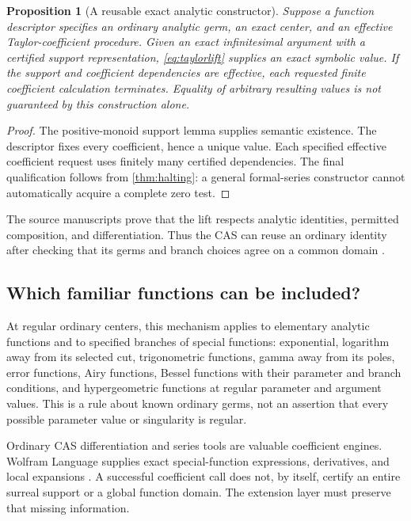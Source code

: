 \documentclass[11pt,letterpaper]{article}
\newtheorem{proposition}[theorem]{Proposition}
\theoremstyle{definition}
\numberwithin{equation}{section}
\begin{document}
\begin{proposition}[A reusable exact analytic constructor]\label{prop:lift}
Suppose a function descriptor specifies an ordinary analytic germ, an exact center, and an effective Taylor-coefficient procedure. Given an exact infinitesimal argument with a certified support representation, \eqref{eq:taylorlift} supplies an exact symbolic value. If the support and coefficient dependencies are effective, each requested finite coefficient calculation terminates. Equality of arbitrary resulting values is not guaranteed by this construction alone.
\end{proposition}
\begin{proof}
The positive-monoid support lemma supplies semantic existence. The descriptor fixes every coefficient, hence a unique value. Each specified effective coefficient request uses finitely many certified dependencies. The final qualification follows from \cref{thm:halting}: a general formal-series constructor cannot automatically acquire a complete zero test.
\end{proof}
The source manuscripts prove that the lift respects analytic identities, permitted composition, and differentiation. Thus the CAS can reuse an ordinary identity after checking that its germs and branch choices agree on a common domain \cite{SourceAnalysis,SourceTrig}.

\subsection{Which familiar functions can be included?}
At regular ordinary centers, this mechanism applies to elementary analytic functions and to specified branches of special functions: exponential, logarithm away from its selected cut, trigonometric functions, gamma away from its poles, error functions, Airy functions, Bessel functions with their parameter and branch conditions, and hypergeometric functions at regular parameter and argument values. This is a rule about known ordinary germs, not an assertion that every possible parameter value or singularity is regular.

Ordinary CAS differentiation and series tools are valuable coefficient engines. Wolfram Language supplies exact special-function expressions, derivatives, and local expansions \cite{WLSpecial}. A successful coefficient call does not, by itself, certify an entire surreal support or a global function domain. The extension layer must preserve that missing information.
\end{document}

